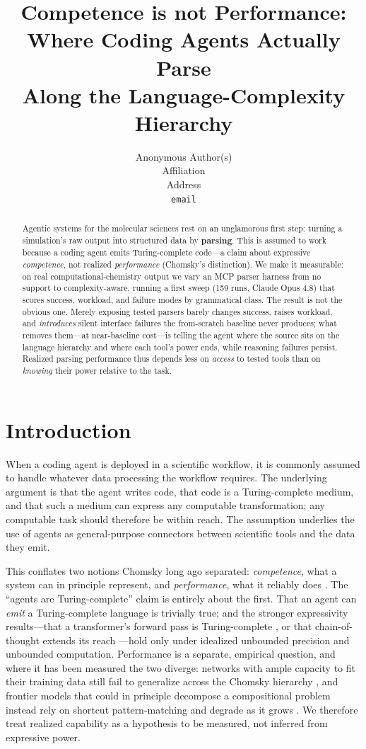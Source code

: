 \documentclass{article}
\title{Competence is not Performance: Where Coding Agents Actually Parse\\
Along the Language-Complexity Hierarchy}
\author{Anonymous Author(s)\\ Affiliation\\ Address\\ \texttt{email}}
\newif\ifshowtheme\showthemefalse
\newcommand{\theme}[1]{\ifshowtheme{\normalfont\sffamily\footnotesize\color{gray}[\,#1\,]\ }\fi}
\begin{document}
\maketitle

\begin{abstract}
Agentic systems for the molecular sciences rest on an unglamorous first step: turning a
simulation's raw output into structured data by \textbf{parsing}. This is assumed to work
because a coding agent emits Turing-complete code---a claim about expressive
\emph{competence}, not realized \emph{performance} (Chomsky's distinction). We make it
measurable: on real computational-chemistry output we vary an MCP parser harness from no
support to complexity-aware, running a first sweep (159 runs, Claude Opus 4.8) that scores
success, workload, and failure modes by grammatical class. The result is not the obvious
one. Merely exposing tested parsers barely changes success, raises workload, and
\emph{introduces} silent interface failures the from-scratch baseline never produces;
what removes them---at near-baseline cost---is telling the agent where the source sits on
the language hierarchy and where each tool's power ends, while reasoning failures persist.
Realized parsing performance thus depends less on \emph{access} to tested tools than on
\emph{knowing} their power relative to the task.
\end{abstract}

\section{Introduction}

\theme{the assumption}When a coding agent is deployed in a scientific workflow, it is
commonly assumed to handle whatever data processing the workflow requires. The
underlying argument is that the agent writes code, that code is a Turing-complete
medium, and that such a medium can express any computable transformation; any
computable task should therefore be within reach. The assumption underlies the use of agents as
general-purpose connectors between scientific tools and the data they emit.

\theme{competence vs.\ performance}This conflates two notions Chomsky long ago
separated: \emph{competence}, what a system can in principle represent, and
\emph{performance}, what it reliably does \citep{chomsky1965}. The ``agents are
Turing-complete'' claim is entirely about the first. That an agent can \emph{emit} a
Turing-complete language is trivially true; and the stronger expressivity results---that
a transformer's forward pass is Turing-complete \citep{perez2021}, or that
chain-of-thought extends its reach \citep{merrill2024cot}---hold only under idealized
unbounded precision and unbounded computation. Performance is a separate, empirical
question, and where it has been measured the two diverge: networks with ample capacity to
fit their training data still fail to generalize across the Chomsky hierarchy
\citep{deletang2023chomsky}, and frontier models that could in principle decompose a
compositional problem instead rely on shortcut pattern-matching and degrade as it grows
\citep{dziri2023}. We therefore treat realized capability as a hypothesis to be measured,
not inferred from expressive power.
\end{document}
